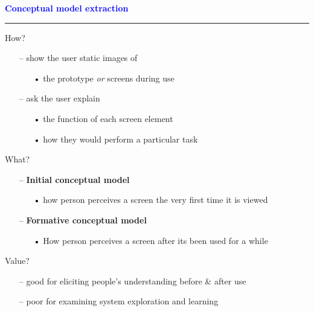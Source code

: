 \documentclass[pdf]{beamer}
\begin{document}
{%
{
\begin{frame}
    \textcolor{Blue}{\textbf{\Large{Conceptual model extraction}}}
    \textcolor{red}{\rule{10cm}{1mm}}
    How?\par
    \begin{itemize}
    \item[\textcolor{black}{--}] show the user static images of
    	\begin{itemize}
    	\item[\textcolor{black}{•}] the prototype \textit{or} screens during use
    	\end{itemize}
    \item[\textcolor{black}{--}] ask the user explain 
    	\begin{itemize}
    	\item[\textcolor{black}{•}] the function of each screen element
        \item[\textcolor{black}{•}] how they would perform a particular task
    	\end{itemize}
    \end{itemize}
    What?\par
    \begin{itemize}
    \item[\textcolor{black}{--}] \textbf{Initial conceptual model}
    	\begin{itemize}
    	\item[\textcolor{black}{•}] how person perceives a screen the very first time it is viewed
    	\end{itemize}
    \item[\textcolor{black}{--}] \textbf{Formative conceptual model} 
    	\begin{itemize}
    	\item[\textcolor{black}{•}] How person perceives a screen after its been used for a while
    	\end{itemize}
    \end{itemize}
    Value?\par
    \begin{itemize}
    \item[\textcolor{black}{--}] good for eliciting people’s understanding before \& after use
    \item[\textcolor{black}{--}] poor for examining system exploration and learning
    \end{itemize}
\end{frame}}

}
\end{document}
